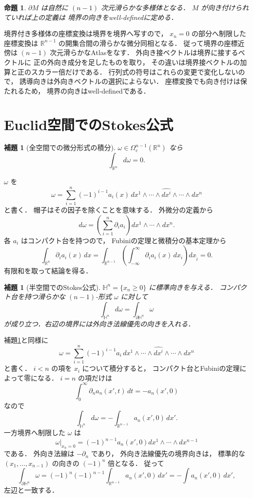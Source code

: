 \documentclass[a5paper,10pt,onecolumn]{jsarticle}
\makeatletter
\theoremstyle{mathnotetheorem}
\newtheorem{lemma}[theorem]{補題}
\newtheorem{proposition}[theorem]{命題}
\renewcommand{\proofname}{証明}
\renewenvironment{proof}[1][\proofname]{%
  \par\pushQED{\qed}\normalfont\topsep4\p@\@plus2\p@\relax
  \trivlist\item[\hskip\labelsep\bfseries #1]\ignorespaces
}{\popQED\endtrivlist\@endpefalse}
\makeatother
\begin{document}
\begin{proposition}\label{prop:boundary-orient}
$\partial M$ は自然に $(n-1)$ 次元滑らかな多様体となる．
$M$ が向き付けられていれば上の定義は
境界の向きをwell-definedに定める．
\end{proposition}
\begin{proof}
境界付き多様体の座標変換は境界を境界へ写すので，
$x_n=0$ の部分へ制限した座標変換は
$\mathbb R^{n-1}$ の開集合間の滑らかな微分同相となる．
従って境界の座標近傍は
$(n-1)$ 次元滑らかなAtlasをなす．
外向き接ベクトルは境界に接するベクトルに
正の外向き成分を足したものを取り，
その違いは境界接ベクトルの加算と正のスカラー倍だけである．
行列式の符号はこれらの変更で変化しないので，
誘導向きは外向きベクトルの選択によらない．
座標変換でも向き付けは保たれるため，
境界の向きはwell-definedである．
\end{proof}

\section{Euclid空間でのStokes公式}

\begin{lemma}[全空間での微分形式の積分]\label{lem:stokes-full}
$\omega\in\Omega_c^{n-1}(\mathbb R^n)$ なら
\[
 \int_{\mathbb R^n}d\omega=0.
\]
\end{lemma}
\begin{proof}
$\omega$ を
\[
 \omega=\sum_{i=1}^n(-1)^{i-1}
 a_i(x)\,dx^1\wedge\cdots
 \wedge\widehat{dx^i}\wedge\cdots\wedge dx^n
\]
と書く．
帽子はその因子を除くことを意味する．
外微分の定義から
\[
 d\omega=
 \left(\sum_{i=1}^n\partial_i a_i\right)
 dx^1\wedge\cdots\wedge dx^n.
\]
各 $a_i$ はコンパクト台を持つので，
Fubiniの定理と微積分の基本定理から
\[
 \int_{\mathbb R^n}\partial_i a_i(x)\,dx
 =\int_{\mathbb R^{n-1}}
 \left(\int_{-\infty}^\infty
   \partial_i a_i(x)\,dx_i\right)dx_{\widehat i}=0.
\]
有限和を取って結論を得る．
\end{proof}

\begin{lemma}[半空間でのStokes公式]\label{lem:stokes-half}
$\mathbb H^n=\{x_n\ge0\}$ に標準向きを与える．
コンパクト台を持つ滑らかな $(n-1)$-形式
$\omega$ に対して
\[
 \int_{\mathbb H^n}d\omega
 =\int_{\partial\mathbb H^n}\omega
\]
が成り立つ．右辺の境界には外向き法線優先の向きを入れる．
\end{lemma}
\begin{proof}
補題\ref{lem:stokes-full}と同様に
\[
 \omega=\sum_{i=1}^n(-1)^{i-1}
 a_i\,dx^1\wedge\cdots
 \wedge\widehat{dx^i}\wedge\cdots\wedge dx^n
\]
と書く．
$i<n$ の項を $x_i$ について積分すると，
コンパクト台とFubiniの定理によって零になる．
$i=n$ の項だけは
\[
 \int_0^\infty\partial_n a_n(x',t)\,dt=-a_n(x',0)
\]
なので
\[
 \int_{\mathbb H^n}d\omega
 =-\int_{\mathbb R^{n-1}}a_n(x',0)\,dx'.
\]
一方境界へ制限した $\omega$ は
\[
 \omega|_{x_n=0}
 =(-1)^{n-1}a_n(x',0)
 dx^1\wedge\cdots\wedge dx^{n-1}
\]
である．
外向き法線は $-\partial_n$ であり，
外向き法線優先の境界向きは，
標準的な $(x_1,\dots,x_{n-1})$ の向きの
$(-1)^n$ 倍となる．
従って
\[
 \int_{\partial\mathbb H^n}\omega
 =(-1)^n(-1)^{n-1}
 \int_{\mathbb R^{n-1}}a_n(x',0)\,dx'
 =-\int a_n(x',0)\,dx',
\]
左辺と一致する．
\end{proof}
\end{document}
